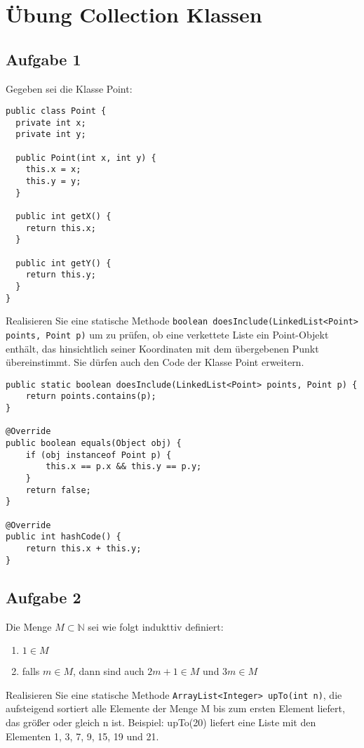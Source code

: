 \chapter{Übung Collection Klassen}

\section{Aufgabe 1}
Gegeben sei die Klasse Point:

\begin{lstlisting}
public class Point {
  private int x;
  private int y;

  public Point(int x, int y) {
    this.x = x;
    this.y = y;
  }

  public int getX() {
    return this.x;
  }

  public int getY() {
    return this.y;
  }
}
\end{lstlisting}

Realisieren Sie eine statische Methode \newline 
\lstinline{boolean doesInclude(LinkedList<Point> points, Point p)} um zu prüfen, ob eine
verkettete Liste ein Point-Objekt enthält, das hinsichtlich seiner Koordinaten
mit dem übergebenen Punkt übereinstimmt. Sie dürfen auch den Code der Klasse
Point erweitern.

\begin{lstlisting}
public static boolean doesInclude(LinkedList<Point> points, Point p) {
    return points.contains(p);
}

@Override
public boolean equals(Object obj) {
    if (obj instanceof Point p) {
        this.x == p.x && this.y == p.y;
    }
    return false;
}

@Override 
public int hashCode() {
    return this.x + this.y;
}
\end{lstlisting}

\section{Aufgabe 2}

Die Menge $M \subset \mathbb{N}$ sei wie folgt indukttiv definiert:

\begin{enumerate}
    \item $1 \in M$
    \item falls $m \in M$, dann sind auch $2m + 1 \in M$ und $3m \in M$
\end{enumerate}

Realisieren Sie eine statische Methode \lstinline{ArrayList<Integer> upTo(int n)}, die
aufsteigend sortiert alle Elemente der Menge M bis zum ersten Element liefert,
das größer oder gleich n ist. Beispiel: upTo(20) liefert eine Liste mit den
Elementen 1, 3, 7, 9, 15, 19 und 21.

